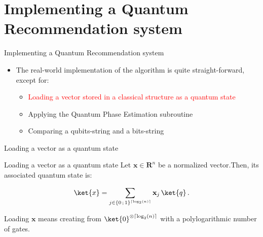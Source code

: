 \documentclass{beamer}
\begin{document}
\section{Implementing a Quantum Recommendation system}

\begin{frame}{Implementing a Quantum Recommendation system}
    \begin{itemize}
        \item The real-world implementation of the algorithm is quite straight-forward, except for:\pause
        \begin{itemize}
            \item \textcolor<5->{red}{Loading a vector stored in a classical structure as a quantum state}\pause
            \item Applying the Quantum Phase Estimation subroutine\pause
            \item Comparing a qubits-string and a bits-string
        \end{itemize}
    \end{itemize}
\end{frame}

\begin{frame}{Loading a vector as a quantum state}
    \begin{block}{Loading a vector as a quantum state}
        Let \(\mathbf{x}\in\mathbf{R}^n\) be a normalized vector.\pause Then, its associated quantum state is:
        
        \[\ket{x}=\sum_{j\in\{0\,;\,1\}^{\left\lceil\log_2(n)\right\rceil}}\mathbf{x}_j\,\ket{q}\,.\]\pause
        
        Loading $\mathbf{x}$ means creating  from $\ket{0}^{\otimes\left\lceil\log_2(n)\right\rceil}$ with a polylogarithmic number of gates\footnotemark.
    \end{block}
\end{frame}
\end{document}
